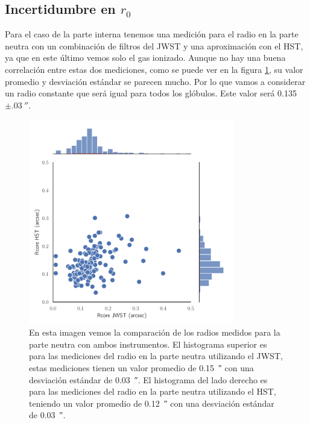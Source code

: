 \documentclass{book}
\begin{document}
\subsection{\boldmath Incertidumbre en $r_0$}

Para el caso de la parte interna tenemos una medición para el radio en la parte neutra con un combinación de filtros del JWST y una aproximación con el HST, ya que en este último vemos solo el gas ionizado. Aunque no hay una buena correlación entre estas dos mediciones, como se puede ver en la figura \ref{fig:Rcore dis}, su valor promedio y desviación estándar se parecen mucho. Por lo que vamos a considerar un radio constante que será igual para todos los glóbulos. Este valor será \SI{0.135}{}$\pm\SI{.03}{\arcsecond}$.

\begin{figure}[htb]
    \centering
    \includegraphics[width=0.8\textwidth]{ultimos/Rcore(1).pdf}
    \caption{En esta imagen vemos la comparación de los radios medidos para la parte neutra con ambos instrumentos. El histograma superior es para las mediciones del radio en la parte neutra utilizando el JWST, estas mediciones tienen un valor promedio de \SI{0.15}{\arcsecond} con una desviación estándar de \SI{0.03}{\arcsecond}. El histograma del lado derecho es para las mediciones del radio en la parte neutra utilizando el HST, teniendo un valor promedio de \SI{0.12}{\arcsecond} con una desviación estándar de \SI{0.03}{\arcsecond}. }
    \label{fig:Rcore dis}
\end{figure}
\end{document}
